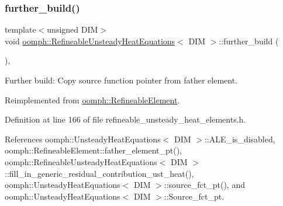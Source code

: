 \subsubsection{\texorpdfstring{further\+\_\+build()}{further\_build()}}
{\footnotesize\ttfamily template$<$unsigned D\+IM$>$ \\
void \hyperlink{classoomph_1_1RefineableUnsteadyHeatEquations}{oomph\+::\+Refineable\+Unsteady\+Heat\+Equations}$<$ D\+IM $>$\+::further\+\_\+build (\begin{DoxyParamCaption}{ }\end{DoxyParamCaption})\hspace{0.3cm}{\ttfamily [inline]}, {\ttfamily [virtual]}}



Further build\+: Copy source function pointer from father element. 



Reimplemented from \hyperlink{classoomph_1_1RefineableElement_a26628ce36dfad028686adeb4694a9ef3}{oomph\+::\+Refineable\+Element}.



Definition at line 166 of file refineable\+\_\+unsteady\+\_\+heat\+\_\+elements.\+h.



References oomph\+::\+Unsteady\+Heat\+Equations$<$ D\+I\+M $>$\+::\+A\+L\+E\+\_\+is\+\_\+disabled, oomph\+::\+Refineable\+Element\+::father\+\_\+element\+\_\+pt(), oomph\+::\+Refineable\+Unsteady\+Heat\+Equations$<$ D\+I\+M $>$\+::fill\+\_\+in\+\_\+generic\+\_\+residual\+\_\+contribution\+\_\+ust\+\_\+heat(), oomph\+::\+Unsteady\+Heat\+Equations$<$ D\+I\+M $>$\+::source\+\_\+fct\+\_\+pt(), and oomph\+::\+Unsteady\+Heat\+Equations$<$ D\+I\+M $>$\+::\+Source\+\_\+fct\+\_\+pt.

\mbox{\label{classoomph_1_1RefineableUnsteadyHeatEquations_a0363c6a60754b66ac9393ba2f8e18d2b}} 
